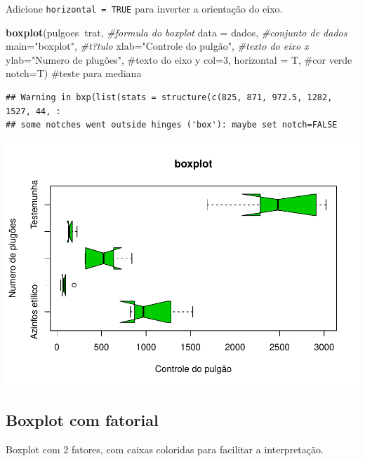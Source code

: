 \documentclass[]{book}
\newenvironment{Shaded}{\begin{snugshade}}{\end{snugshade}}
\newcommand{\CommentTok}[1]{\textcolor[rgb]{0.56,0.35,0.01}{\textit{#1}}}
\newcommand{\DataTypeTok}[1]{\textcolor[rgb]{0.13,0.29,0.53}{#1}}
\newcommand{\KeywordTok}[1]{\textcolor[rgb]{0.13,0.29,0.53}{\textbf{#1}}}
\newcommand{\NormalTok}[1]{#1}
\newcommand{\OperatorTok}[1]{\textcolor[rgb]{0.81,0.36,0.00}{\textbf{#1}}}
\newcommand{\StringTok}[1]{\textcolor[rgb]{0.31,0.60,0.02}{#1}}
\begin{document}
Adicione \texttt{horizontal\ =\ TRUE} para inverter a orientação do eixo.

\begin{Shaded}
\begin{Highlighting}[]
\KeywordTok{boxplot}\NormalTok{(pulgoes}\OperatorTok{~}\NormalTok{trat,              }\CommentTok{#formula do boxplot}
        \DataTypeTok{data =}\NormalTok{ dados,              }\CommentTok{#conjunto de dados}
        \DataTypeTok{main=}\StringTok{"boxplot"}\NormalTok{,            }\CommentTok{#t?tulo}
        \DataTypeTok{xlab=}\StringTok{"Controle do pulgão"}\NormalTok{, }\CommentTok{#texto do eixo x }
        \DataTypeTok{ylab=}\StringTok{"Numero de plugões",  #texto do eixo y}
\StringTok{        col=3, horizontal = T,     #cor verde  }
\StringTok{        notch=T)                   #teste para mediana}
\end{Highlighting}
\end{Shaded}

\begin{verbatim}
## Warning in bxp(list(stats = structure(c(825, 871, 972.5, 1282, 1527, 44, :
## some notches went outside hinges ('box'): maybe set notch=FALSE
\end{verbatim}

\includegraphics{TudodoR_files/figure-latex/unnamed-chunk-172-1.pdf}

\hypertarget{boxplot-com-fatorial}{%
\subsection{Boxplot com fatorial}\label{boxplot-com-fatorial}}

Boxplot com 2 fatores, com caixas coloridas para facilitar a interpretação.
\end{document}
